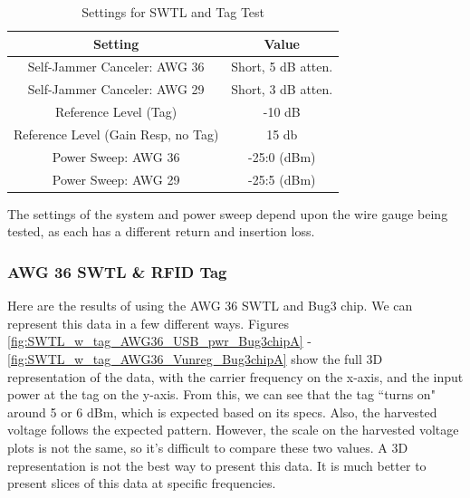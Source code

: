 \documentclass[12pt,onecolumn,titlepage]{article}
\begin{document}
\begin{table}[h!]
\centering
	\caption{ Settings for SWTL and Tag Test }
	\begin{tabular}{| c | c |}
	\hline
	{\bf Setting} & {\bf Value} \\ \hline
	Self-Jammer Canceler: AWG 36 & Short, 5 dB atten.  \\ \hline
	Self-Jammer Canceler: AWG 29 & Short, 3 dB atten.  \\ \hline
	Reference Level (Tag) & -10 dB  \\ \hline
	Reference Level (Gain Resp, no Tag) & 15 db \\ \hline
	Power Sweep: AWG 36 & -25:0 (dBm)  \\ \hline
	Power Sweep: AWG 29 & -25:5 (dBm) \\ \hline
	\end{tabular}
\label{tab:SWTL_w_tag_test_settings_gainresp}
\end{table}



The settings of the system and power sweep depend upon the wire gauge being tested, as each has a different return and insertion loss. 


\subsubsection{AWG 36 SWTL \& RFID Tag}
\indent \indent Here are the results of using the AWG 36 SWTL and Bug3 chip. We can represent this data in a few different ways. Figures \ref{fig:SWTL_w_tag_AWG36_USB_pwr_Bug3chipA} - \ref{fig:SWTL_w_tag_AWG36_Vunreg_Bug3chipA} show the full 3D representation of the data, with the carrier frequency on the x-axis, and the input power at the tag on the y-axis. From this, we can see that the tag ``turns on" around 5 or 6 dBm, which is expected based on its specs. Also, the harvested voltage follows the expected pattern. However, the scale on the harvested voltage plots is not the same, so it's difficult to compare these two values. A 3D representation is not the best way to present this data. It is much better to present slices of this data at specific frequencies.
\end{document}
